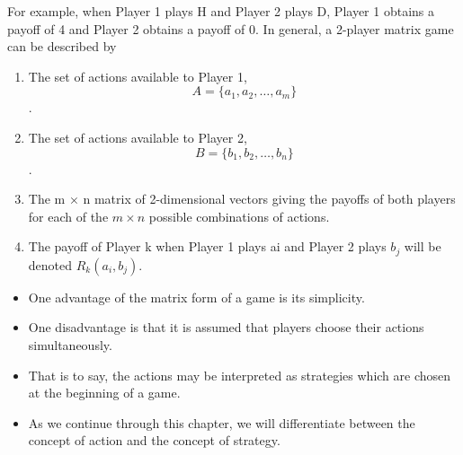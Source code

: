 \documentclass[]{report}
\begin{document}
\noindent For example, when Player 1 plays H and Player 2 plays D, Player 1
obtains a payoff of 4 and Player 2 obtains a payoff of 0.
\smallskip
\noindent In general, a 2-player matrix game can be described by
\begin{enumerate}
	\item The set of actions available to Player 1,
	\[A = \{a_1, a_2, \ldots , a_m\}\].
\item The set of actions available to Player 2,
	\[B = \{b_1, b_2, \ldots , b_n\}\].
\item The m × n matrix of 2-dimensional vectors giving the
	payoffs of both players for each of the $m \times n$ possible
	combinations of actions. 
\item The payoff of Player k when
	Player 1 plays ai and Player 2 plays $b_j$ will be
	denoted $R_k (a_i, b_j)$.
	
\end{enumerate}

\begin{itemize}
	\item One advantage of the matrix form of a game is its simplicity.
	\item One disadvantage is that it is assumed that players choose their
	actions simultaneously.
	\item That is to say, the actions may be
	interpreted as strategies which are chosen at the beginning of a
	game.
	\item As we continue through this chapter, we will differentiate between
	the concept of action and the concept of strategy.
	
\end{itemize}

\end{document}
